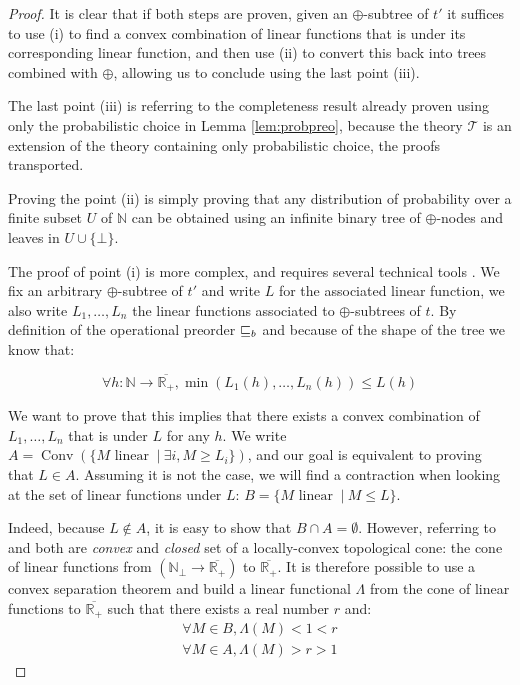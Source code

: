 \begin{proof}
    It is clear that if both steps are proven, given an $\oplus$-subtree of $t'$
    it suffices to use (i) 
    to find a convex combination of linear functions that is under its
    corresponding linear function, and then use (ii) to convert this 
    back into trees combined with $\oplus$, allowing us to conclude using 
    the last point (iii).

    The last point (iii) is referring to the completeness result already proven 
    using only the probabilistic choice in Lemma \ref{lem:probpreo}, because 
    the theory $\mathcal{T}$ is an extension of the theory containing only 
    probabilistic choice, the proofs transported.

    Proving the point (ii) is simply proving that any distribution of probability 
    over a finite subset $U$ of $\mathbb{N}$
    can be obtained using an infinite binary tree of $\oplus$-nodes and 
    leaves in $U \cup \{ \bot \}$.

    The proof of point (i) is more complex, and requires several technical 
    tools \cite{JGL-mscs16}. We fix an arbitrary $\oplus$-subtree of $t'$ and
    write $L$ for the associated linear function, we also write 
    $L_1, \dots, L_n$ the linear functions associated to $\oplus$-subtrees of
    $t$. By definition of the operational preorder $\sqsubseteq_b$ and because 
    of the shape of the tree we know that:

    \begin{equation*}
        \forall h : \mathbb{N} \to \overline{\mathbb{R}_+}, 
            \min (L_1 (h), \dots, L_n (h)) \leq L(h)
    \end{equation*}

    We want to prove that this implies that there exists a convex combination 
    of $L_1, \dots, L_n$ that is under $L$ for any $h$. We write 
    $A = \operatorname{Conv}\left( \{ M \text{ linear } ~|~ \exists i, M \geq
    L_i \} \right)$, and our goal is equivalent to proving that $L \in A$. Assuming it 
    is not the case, we will find a contraction when looking at the 
    set of linear functions under $L$: $B = \{ M \text{ linear } ~|~ M \leq L
    \}$.

    Indeed, because $L \not \in A$, it is easy to show that $B \cap A =
    \emptyset$. However, referring to \cite{JGL-mscs16} and \cite{KeimelP2016} 
    both are \emph{convex} and \emph{closed} set of a locally-convex topological 
    cone: the cone of linear functions from $(\mathbb{N}_\bot \to
    \overline{\mathbb{R}_+})$ to $\overline{\mathbb{R}_+}$. It is therefore 
    possible to use a convex separation theorem \cite{JGL-mscs16} and build 
    a linear functional $\Lambda$ from the cone of linear functions to
    $\overline{\mathbb{R}_+}$ such that there exists a real number $r$
    and:
    \begin{align*}
        \forall M \in B, \Lambda (M) < 1 < r \\
        \forall M \in A, \Lambda (M) > r > 1
    \end{align*}


\end{proof}
